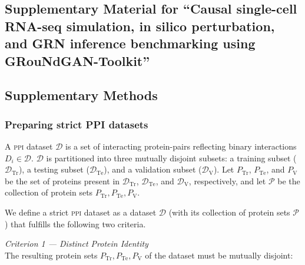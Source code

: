 \begin{singlespace}
\chapter[Supplementary Material for ``Causal single-cell RNA-seq simulation, in silico perturbation, and GRN inference benchmarking using GRouNdGAN-Toolkit'']{Supplementary Material for ``Causal single-cell RNA-seq simulation, in silico perturbation, and GRN inference benchmarking using GRouNdGAN-Toolkit''}
%
\end{singlespace}

\setcounter{table}{0}
\renewcommand{\thetable}{S\arabic{table}}
\renewcommand{\thefigure}{S\arabic{figure}}

\section*{Supplementary Methods}\label{sec:intrepppid_supp_methods}
\subsection*{Preparing strict PPI datasets}
A \textsc{ppi} dataset $\mathcal{D}$ is a set of interacting protein-pairs reflecting binary interactions $D_i \in \mathcal{D}$. $\mathcal{D}$ is partitioned into three mutually disjoint subsets: a training subset ($\mathcal{D}_\textrm{Tr}$), a testing subset ($\mathcal{D}_\textrm{Te}$), and a validation subset ($\mathcal{D}_\textrm{V}$). Let $P_\textrm{Tr}$, $P_\textrm{Te}$, and $P_\textrm{V}$ be the set of proteins present in $\mathcal{D}_\textrm{Tr}$, $\mathcal{D}_\textrm{Te}$, and
$\mathcal{D}_\textrm{V}$, respectively, and let $\mathcal{P}$ be the collection of protein sets ${P_\textrm{Tr}, P_\textrm{Te},  P_\textrm{V}}$.

We define a strict \textsc{ppi} dataset as a dataset $\mathcal{D}$ (with its collection of protein sets $\mathcal{P}$) that fulfills the following two criteria.

\textit{Criterion 1 --- Distinct Protein Identity}\\
The resulting protein sets $P_\textrm{Tr}, P_\textrm{Te},  P_\textrm{V}$ of the dataset must be mutually disjoint:

